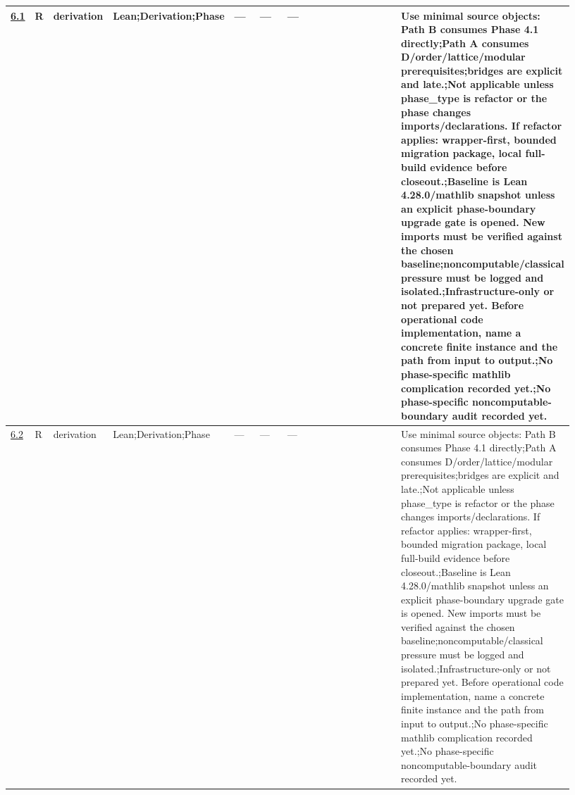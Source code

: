 \begin{longtable}{L{0.026\linewidth} L{0.024\linewidth} L{0.045\linewidth} L{0.07\linewidth} L{0.065\linewidth} L{0.075\linewidth} L{0.11\linewidth} L{0.19\linewidth} L{0.155\linewidth} L{0.17\linewidth}}
\hline
\addlinespace[0.24em]
\hyperlink{phase-row-6-1}{6.1} & R & derivation & Lean;\newline Derivation;\newline Phase & --- & --- & --- &  &  & Use minimal source objects: Path B consumes Phase 4.1 directly;\newline Path A consumes D/\allowbreak{}order/\allowbreak{}lattice/\allowbreak{}modular prerequisites;\newline bridges are explicit and late.;\newline Not applicable unless phase\_type is refactor or the phase changes imports/\allowbreak{}declarations. If refactor applies: wrapper-first, bounded migration package, local full-build evidence before closeout.;\newline Baseline is Lean 4.28.0/\allowbreak{}mathlib snapshot unless an explicit phase-boundary upgrade gate is opened. New imports must be verified against the chosen baseline;\newline noncomputable/\allowbreak{}classical pressure must be logged and isolated.;\newline Infrastructure-only or not prepared yet. Before operational code implementation, name a concrete finite instance and the path from input to output.;\newline No phase-specific mathlib complication recorded yet.;\newline No phase-specific noncomputable-boundary audit recorded yet.\\
\hline
\addlinespace[0.24em]
\hyperlink{phase-row-6-2}{6.2} & R & derivation & Lean;\newline Derivation;\newline Phase & --- & --- & --- &  &  & Use minimal source objects: Path B consumes Phase 4.1 directly;\newline Path A consumes D/\allowbreak{}order/\allowbreak{}lattice/\allowbreak{}modular prerequisites;\newline bridges are explicit and late.;\newline Not applicable unless phase\_type is refactor or the phase changes imports/\allowbreak{}declarations. If refactor applies: wrapper-first, bounded migration package, local full-build evidence before closeout.;\newline Baseline is Lean 4.28.0/\allowbreak{}mathlib snapshot unless an explicit phase-boundary upgrade gate is opened. New imports must be verified against the chosen baseline;\newline noncomputable/\allowbreak{}classical pressure must be logged and isolated.;\newline Infrastructure-only or not prepared yet. Before operational code implementation, name a concrete finite instance and the path from input to output.;\newline No phase-specific mathlib complication recorded yet.;\newline No phase-specific noncomputable-boundary audit recorded yet.\\

\end{longtable}
